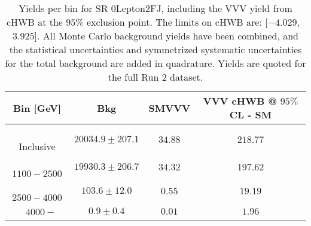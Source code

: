 \begin{table}[!htbp]
    \small
    \center
    \begin{tabular}{c||c|c|c}
    Bin [GeV] & Bkg & SMVVV & \pbox{20cm}{VVV \\ cHWB @ $95\%$ CL - SM \\ }\\
    \hline
    \pbox{20cm}{ ~ \\Inclusive\\ } & $20034.9 \pm 207.1$ & $34.88$ & $218.77$\\
    \hline
    \pbox{20cm}{ ~ \\$1100-2500$\\ } & $19930.3 \pm 206.7$ & $34.32$ & $197.62$\\
    \hline
    \pbox{20cm}{ ~ \\$2500-4000$\\ } & $103.6 \pm 12.0$ & $0.55$ & $19.19$\\
    \hline
    \pbox{20cm}{ ~ \\$4000-$\\ } & $0.9 \pm 0.4$ & $0.01$ & $1.96$\\
\end{tabular}
    \caption{Yields per bin for SR 0Lepton2FJ, including the VVV yield from cHWB at the $95$\% exclusion point. The limits on cHWB are: [$-4.029$,~$3.925$]. All Monte Carlo background yields have been combined, and the statistical uncertainties and symmetrized systematic uncertainties for the total background are added in quadrature. Yields are quoted for the full Run 2 dataset.}
    \label{tab:0Lepton2FJ$binssignal}
\end{table}
